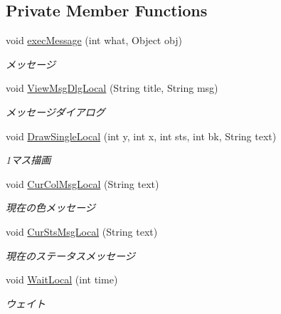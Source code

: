 \subsection*{Private Member Functions}
\begin{DoxyCompactItemize}
\item 
void \hyperlink{classjp_1_1gr_1_1java__conf_1_1yuta__yoshinaga_1_1reversi_1_1model_1_1_reversi_play_a8c5c00aeb6656d7806416ac577b77e3b}{exec\+Message} (int what, Object obj)
\begin{DoxyCompactList}\small\item\em メッセージ \end{DoxyCompactList}\item 
void \hyperlink{classjp_1_1gr_1_1java__conf_1_1yuta__yoshinaga_1_1reversi_1_1model_1_1_reversi_play_ae673231f92f3bd36a43acbc713a97513}{View\+Msg\+Dlg\+Local} (String title, String msg)
\begin{DoxyCompactList}\small\item\em メッセージダイアログ \end{DoxyCompactList}\item 
void \hyperlink{classjp_1_1gr_1_1java__conf_1_1yuta__yoshinaga_1_1reversi_1_1model_1_1_reversi_play_a0218c589d8567d52f92ab87bc4bec30f}{Draw\+Single\+Local} (int y, int x, int sts, int bk, String text)
\begin{DoxyCompactList}\small\item\em 1マス描画 \end{DoxyCompactList}\item 
void \hyperlink{classjp_1_1gr_1_1java__conf_1_1yuta__yoshinaga_1_1reversi_1_1model_1_1_reversi_play_a0dec187d4c4372a3470fac8e341ae9e8}{Cur\+Col\+Msg\+Local} (String text)
\begin{DoxyCompactList}\small\item\em 現在の色メッセージ \end{DoxyCompactList}\item 
void \hyperlink{classjp_1_1gr_1_1java__conf_1_1yuta__yoshinaga_1_1reversi_1_1model_1_1_reversi_play_a4c4d14ddaf65d3643bd7edc7b562f4d1}{Cur\+Sts\+Msg\+Local} (String text)
\begin{DoxyCompactList}\small\item\em 現在のステータスメッセージ \end{DoxyCompactList}\item 
void \hyperlink{classjp_1_1gr_1_1java__conf_1_1yuta__yoshinaga_1_1reversi_1_1model_1_1_reversi_play_aec398cf0d2ac7bd1d1b64be67bcadde2}{Wait\+Local} (int time)
\begin{DoxyCompactList}\small\item\em ウェイト \end{DoxyCompactList}\end{DoxyCompactItemize}
